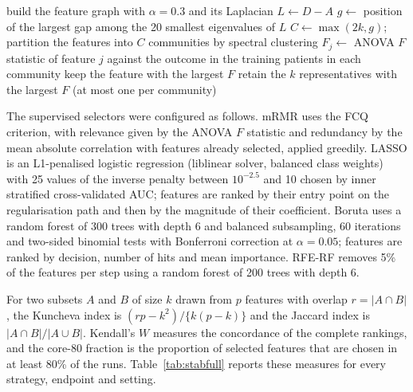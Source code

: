 \documentclass[11pt]{article}
\begin{document}
\begin{algorithm}[H]
\caption{Graph-FS, hybrid (graph-guided relevance, introduced in this study)}\label{alg:hyb}
\begin{algorithmic}[1]
\State build the feature graph with $\alpha=0.3$ and its Laplacian $L \gets D - A$
\State $g \gets$ position of the largest gap among the 20 smallest eigenvalues of $L$
\State $C \gets \max(2k, g)$; partition the features into $C$ communities by spectral clustering
\State $F_j \gets$ ANOVA $F$ statistic of feature $j$ against the outcome in the training patients
\State in each community keep the feature with the largest $F$
\State retain the $k$ representatives with the largest $F$ (at most one per community)
\end{algorithmic}
\end{algorithm}

The supervised selectors were configured as follows. mRMR uses the FCQ criterion, with relevance given by the ANOVA $F$ statistic and redundancy by the mean absolute correlation with features already selected, applied greedily. LASSO is an L1-penalised logistic regression (liblinear solver, balanced class weights) with 25 values of the inverse penalty between $10^{-2.5}$ and 10 chosen by inner stratified cross-validated AUC; features are ranked by their entry point on the regularisation path and then by the magnitude of their coefficient. Boruta uses a random forest of 300 trees with depth 6 and balanced subsampling, 60 iterations and two-sided binomial tests with Bonferroni correction at $\alpha=0.05$; features are ranked by decision, number of hits and mean importance. RFE-RF removes 5\% of the features per step using a random forest of 200 trees with depth 6.

For two subsets $A$ and $B$ of size $k$ drawn from $p$ features with overlap $r=|A\cap B|$, the Kuncheva index is $(rp-k^2)/\{k(p-k)\}$ and the Jaccard index is $|A\cap B|/|A\cup B|$. Kendall's $W$ measures the concordance of the complete rankings, and the core-80 fraction is the proportion of selected features that are chosen in at least 80\% of the runs. Table~\ref{tab:stabfull} reports these measures for every strategy, endpoint and setting.

\begin{table}[!htb]
\centering
\caption{Feature-selection stability: Jaccard index (J), Kendall's $W$ (W) and core-80 fraction (C80) for every strategy and setting (5-fold CV design).}\label{tab:stabfull}
\resizebox{\textwidth}{!}{}
\end{table}
\end{document}
